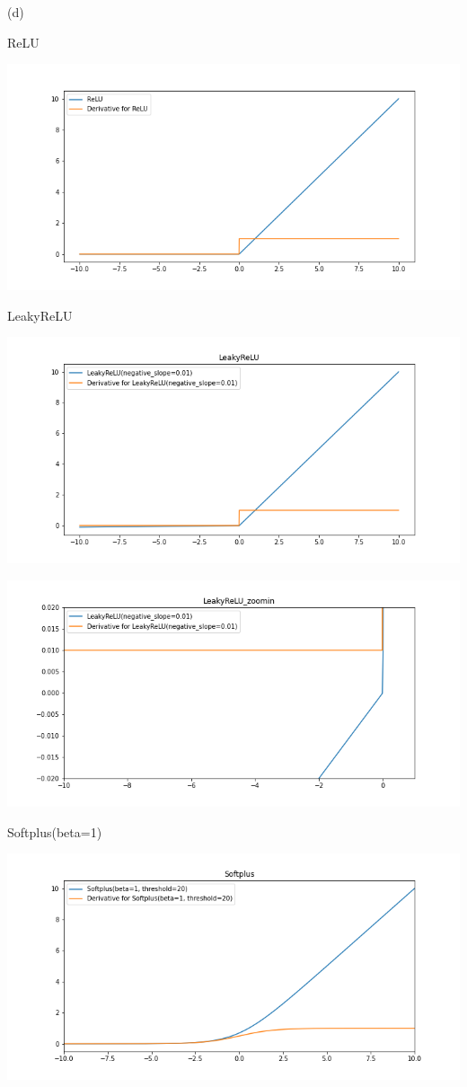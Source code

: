(d)


ReLU 

\includegraphics[width=\linewidth]{./imgs/relu.png}

LeakyReLU

\includegraphics[width=\linewidth]{./imgs/leakyrelu.png}


\includegraphics[width=\linewidth]{./imgs/leakyrelu_zoomin.png}

Softplus(beta=1)

\includegraphics[width=\linewidth]{./imgs/softplus.png}


